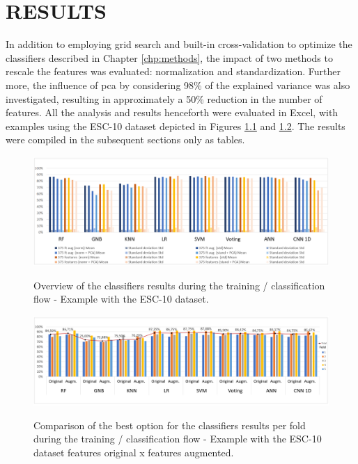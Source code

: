 \chapter{RESULTS}
\label{chp:results}

In addition to employing grid search and built-in cross-validation to optimize the classifiers described in Chapter \ref{chp:methods}, the impact of two methods to rescale the features was evaluated: normalization and standardization. Further more, the influence of \gls{pca} by considering 98\% of the explained variance was also investigated, resulting in approximately a 50\% reduction in the number of features. All the analysis and results henceforth were evaluated in Excel, with examples using the ESC-10 dataset depicted in Figures \ref{fig:results_ESC-10_classification_results_overview} and \ref{fig:results_ESC-10_classification_results_fold_overview}. The results were compiled in the subsequent sections only as tables.

\begin{figure}[htbp]
    \centering
        \caption{Overview of the classifiers results during the training / classification flow - Example with the ESC-10 dataset.}
        \includegraphics[width=1\textwidth]{resources/images/060-results/Results_classification_flow_ESC-10_2.png}
        \label{fig:results_ESC-10_classification_results_overview}
\end{figure}

\begin{figure}[htbp]
    \centering
        \caption{Comparison of the best option for the classifiers results per fold during the training / classification flow - Example with the ESC-10 dataset features original x features augmented.}
        \includegraphics[width=.95\textwidth]{resources/images/060-results/Results_classification_flow_ESC-10_1.png}
        \label{fig:results_ESC-10_classification_results_fold_overview}
\end{figure}


